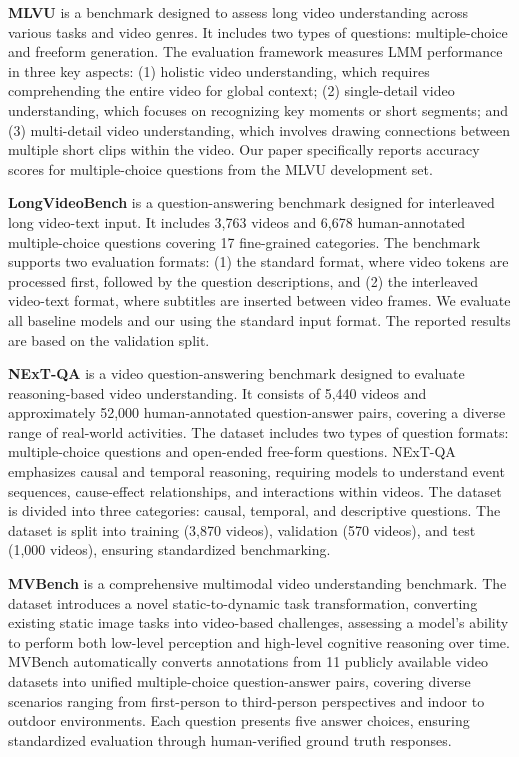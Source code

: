\noindent\textbf{MLVU} \cite{zhou2024mlvu} is a benchmark designed to assess long video understanding across various tasks and video genres. It includes two types of questions: multiple-choice and freeform generation. The evaluation framework measures LMM performance in three key aspects: (1) holistic video understanding, which requires comprehending the entire video for global context; (2) single-detail video understanding, which focuses on recognizing key moments or short segments; and (3) multi-detail video understanding, which involves drawing connections between multiple short clips within the video. Our paper specifically reports accuracy scores for multiple-choice questions from the MLVU development set.

\noindent\textbf{LongVideoBench} \cite{wu2025longvideobench} is a question-answering benchmark designed for interleaved long video-text input. It includes 3,763 videos and 6,678 human-annotated multiple-choice questions covering 17 fine-grained categories. The benchmark supports two evaluation formats: (1) the standard format, where video tokens are processed first, followed by the question descriptions, and (2) the interleaved video-text format, where subtitles are inserted between video frames. We evaluate all baseline models and our \model using the standard input format. The reported results are based on the validation split.

\noindent\textbf{NExT-QA} \cite{xiao2021next} is a video question-answering benchmark designed to evaluate reasoning-based video understanding. It consists of 5,440 videos and approximately 52,000 human-annotated question-answer pairs, covering a diverse range of real-world activities. The dataset includes two types of question formats: multiple-choice questions and open-ended free-form questions. NExT-QA emphasizes causal and temporal reasoning, requiring models to understand event sequences, cause-effect relationships, and interactions within videos. The dataset is divided into three categories: causal, temporal, and descriptive questions. The dataset is split into training (3,870 videos), validation (570 videos), and test (1,000 videos), ensuring standardized benchmarking.

\noindent\textbf{MVBench} \cite{li2024mvbench} is a comprehensive multimodal video understanding benchmark. The dataset introduces a novel static-to-dynamic task transformation, converting existing static image tasks into video-based challenges, assessing a model's ability to perform both low-level perception and high-level cognitive reasoning over time. MVBench automatically converts annotations from 11 publicly available video datasets into unified multiple-choice question-answer pairs, covering diverse scenarios ranging from first-person to third-person perspectives and indoor to outdoor environments. Each question presents five answer choices, ensuring standardized evaluation through human-verified ground truth responses.

